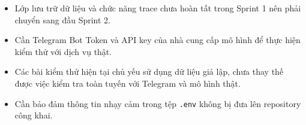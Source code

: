 \documentclass[12pt,a4paper]{article}
\begin{document}
\begin{itemize}
    \item Lớp lưu trữ dữ liệu và chức năng trace chưa hoàn tất trong Sprint 1 nên phải chuyển sang đầu Sprint 2.

    \item Cần Telegram Bot Token và API key của nhà cung cấp mô hình để thực hiện kiểm thử với dịch vụ thật.

    \item Các bài kiểm thử hiện tại chủ yếu sử dụng dữ liệu giả lập, chưa thay thế được việc kiểm tra toàn tuyến với Telegram và mô hình thật.

    \item Cần bảo đảm thông tin nhạy cảm trong tệp \texttt{.env} không bị đưa lên repository công khai.
\end{itemize}
\end{document}
